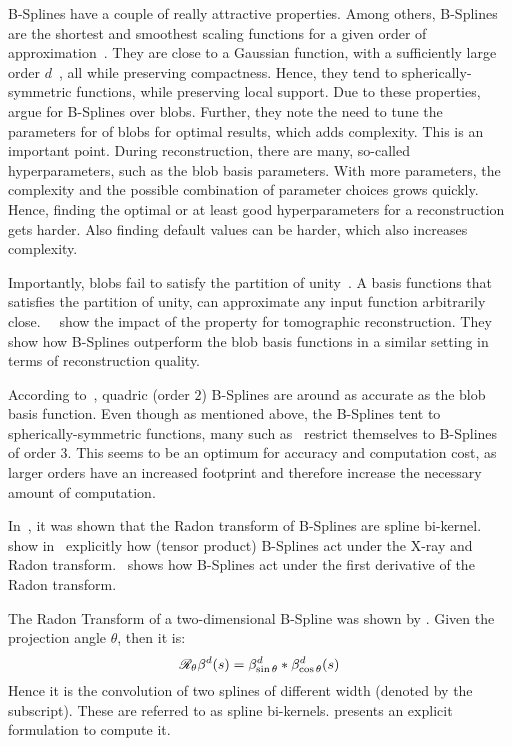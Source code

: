 B-Splines have a couple of really attractive properties. Among others, B-Splines are the shortest
and smoothest scaling functions for a given order of approximation~\cite{momey_b-spline_2012}. They
are close to a Gaussian function, with a sufficiently large order \(d\)~\cite{momey_b-spline_2012},
all while preserving compactness. Hence, they tend to spherically-symmetric functions, while
preserving local support. Due to these properties, \citeauthor*{momey_new_2011}\cite{momey_new_2011}
argue for B-Splines over blobs. Further, they note the need to tune the parameters for of blobs for
optimal results, which adds complexity. This is an important point. During reconstruction, there are
many, so-called hyperparameters, such as the blob basis parameters. With more parameters, the
complexity and the possible combination of parameter choices grows quickly. Hence, finding the
optimal or at least good hyperparameters for a reconstruction gets harder. Also finding default
values can be harder, which also increases complexity.

Importantly, blobs fail to satisfy the partition of unity~\cite{nilchian_fast_2013}. A basis
functions that satisfies the partition of unity, can approximate any input function arbitrarily
close.~\citeauthor*{nilchian_fast_2013}~\cite{nilchian_fast_2013} show the impact of the property
for tomographic reconstruction. They show how B-Splines outperform the blob basis functions in a
similar setting in terms of reconstruction quality.

According to~\cite{momey_spline_2015}, quadric (order \(2\)) B-Splines are around as accurate as the
blob basis function. Even though as mentioned above, the B-Splines tent to spherically-symmetric
functions, many such
as~\cite{momey_new_2011,momey_b-spline_2012,momey_spline_2015,nilchian_fast_2013} restrict
themselves to B-Splines of order \(3\). This seems to be an optimum for accuracy and computation
cost, as larger orders have an increased footprint and therefore increase the necessary amount of
computation.

In~\cite{horbelt_discretization_2002}, it was shown that the Radon transform of B-Splines are spline
bi-kernel. \citeauthor*{entezari_box_2012} show in~\cite{entezari_box_2012} explicitly how (tensor
product) B-Splines act under the X-ray and Radon transform.~\cite{nilchian_differential_2012} shows
how B-Splines act under the first derivative of the Radon transform.

The Radon Transform of a two-dimensional B-Spline was shown by
\citeauthor*{horbelt_discretization_2002}\cite{horbelt_discretization_2002}. Given the projection
angle \(\theta\), then it is:
\begin{equation}
	\mathscr{R}_\theta\beta^d(s) = \beta^d_{\sin\theta} * \beta^d_{\cos\theta}(s)
\end{equation}
Hence it is the convolution of two splines of different width (denoted by the subscript). These are
referred to as spline bi-kernels. \citeauthor*{horbelt_discretization_2002} presents an explicit
formulation to compute it.

